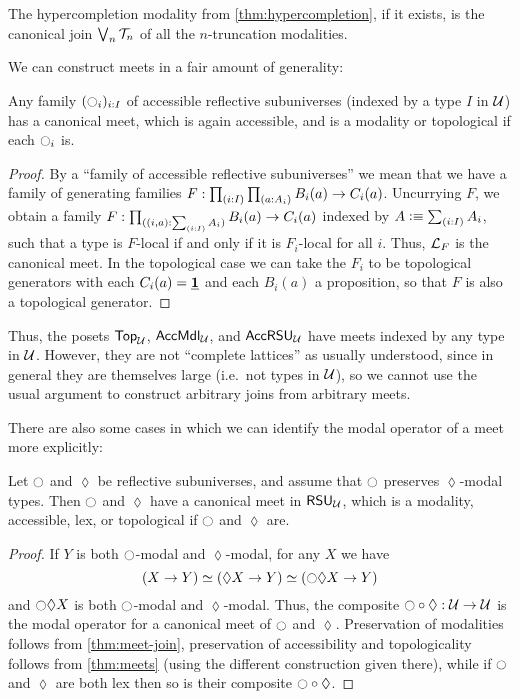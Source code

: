 \begin{eg}
  The hypercompletion modality from \cref{thm:hypercompletion}, if it exists, is the canonical join $\bigvee_n \mathcal{T}_{n}$ of all the $n$-truncation modalities.
\end{eg}

We can construct meets in a fair amount of generality:

\begin{thm}\label{thm:meets}
  Any family $({\ocircle}_i)_{i:I}$ of accessible reflective subuniverses (indexed by a type $I$ in $\mathcal{U}$) has a canonical meet, which is again accessible, and is a modality or topological if each ${\ocircle}_i$ is.
\end{thm}
\begin{proof}
  By a ``family of accessible reflective subuniverses'' we mean that we have a family of generating families $F : \prd{i:I}\prd{a:A_i} B_i(a) \to C_i(a)$.
  Uncurrying $F$, we obtain a family $F : \prd{(i,a):\sm{i:I} A_i} B_i(a) \to C_i(a)$ indexed by $A \defeq \sm{i:I} A_i$, such that a type is $F$-local if and only if it is $F_i$-local for all $i$.
  Thus, $\mathcal{L}_{F}$ is the canonical meet.
  In the topological case we can take the $F_i$ to be topological generators with each $C_i(a)=\underline{\mathbf{1}}$ and each $B_i(a)$ a proposition, so that $F$ is also a topological generator.
\end{proof}

Thus, the posets $\mathsf{Top}_{\mathcal{U}}$, $\mathsf{AccMdl}_{\mathcal{U}}$, and $\mathsf{AccRSU}_{\mathcal{U}}$ have meets indexed by any type in $\mathcal{U}$.
However, they are not ``complete lattices'' as usually understood, since in general they are themselves large (i.e.\ not types in $\mathcal{U}$), so we cannot use the usual argument to construct arbitrary joins from arbitrary meets.

There are also some cases in which we can identify the modal operator of a meet more explicitly:

\begin{thm}\label{thm:meets2}
  Let ${\ocircle}$ and $\lozenge$ be reflective subuniverses, and assume that ${\ocircle}$ preserves $\lozenge$-modal types.
  Then ${\ocircle}$ and $\lozenge$ have a canonical meet in $\mathsf{RSU}_{\mathcal{U}}$, which is a modality, accessible, lex, or topological if ${\ocircle}$ and $\lozenge$ are.
\end{thm}
\begin{proof}
  If $Y$ is both ${\ocircle}$-modal and $\lozenge$-modal, for any $X$ we have
  \[ (X\to Y) \simeq (\lozenge X \to Y) \simeq ({\ocircle} \lozenge X \to Y) \]
  and ${\ocircle} \lozenge X$ is both ${\ocircle}$-modal and $\lozenge$-modal.
  Thus, the composite ${\ocircle}\circ\lozenge : \mathcal{U}\to\mathcal{U}$ is the modal operator for a canonical meet of ${\ocircle}$ and $\lozenge$.
  Preservation of modalities follows from \cref{thm:meet-join}, preservation of accessibility and topologicality follows from \cref{thm:meets} (using the different construction given there), while if ${\ocircle}$ and $\lozenge$ are both lex then so is their composite ${\ocircle}\circ \lozenge$.
\end{proof}

